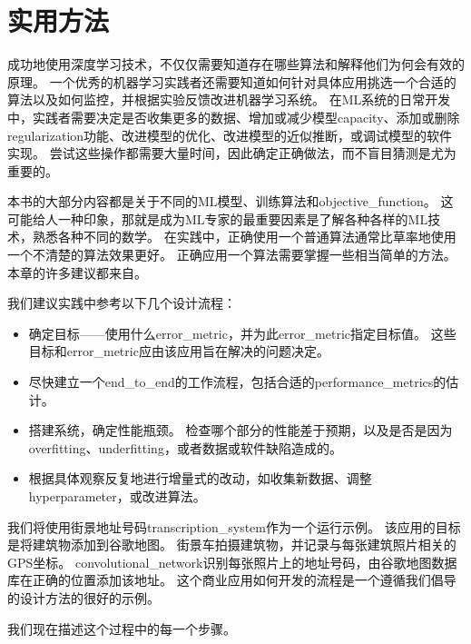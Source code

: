 \chapter{实用方法}
\label{chap:practical_methodology}
成功地使用深度学习技术，不仅仅需要知道存在哪些算法和解释他们为何会有效的原理。
一个优秀的机器学习实践者还需要知道如何针对具体应用挑选一个合适的算法以及如何监控，并根据实验反馈改进机器学习系统。
在\gls{ML}系统的日常开发中，实践者需要决定是否收集更多的数据、增加或减少模型\gls{capacity}、添加或删除\gls{regularization}功能、改进模型的优化、改进模型的近似推断，或调试模型的软件实现。
尝试这些操作都需要大量时间，因此确定正确做法，而不盲目猜测是尤为重要的。


本书的大部分内容都是关于不同的\gls{ML}模型、训练算法和\gls{objective_function}。
这可能给人一种印象，那就是成为\gls{ML}专家的最重要因素是了解各种各样的\gls{ML}技术，熟悉各种不同的数学。
在实践中，正确使用一个普通算法通常比草率地使用一个不清楚的算法效果更好。
正确应用一个算法需要掌握一些相当简单的方法。
本章的许多建议都来自\cite{ng-lecture-advice}。


我们建议实践中参考以下几个设计流程：
\begin{itemize}
\item 确定目标——使用什么\gls{error_metric}，并为此\gls{error_metric}指定目标值。
这些目标和\gls{error_metric}应由该应用旨在解决的问题决定。


\item 尽快建立一个\gls{end_to_end}的工作流程，包括合适的\gls{performance_metrics}的估计。

\item 搭建系统，确定性能瓶颈。
检查哪个部分的性能差于预期，以及是否是因为\gls{overfitting}、\gls{underfitting}，或者数据或软件缺陷造成的。

\item 根据具体观察反复地进行增量式的改动，如收集新数据、调整\gls{hyperparameter}，或改进算法。
\end{itemize}


我们将使用街景地址号码\gls{transcription_system}\citep{Goodfellow+et+al-ICLR2014a}作为一个运行示例。
该应用的目标是将建筑物添加到谷歌地图。
街景车拍摄建筑物，并记录与每张建筑照片相关的GPS坐标。
\gls{convolutional_network}识别每张照片上的地址号码，由谷歌地图数据库在正确的位置添加该地址。
这个商业应用如何开发的流程是一个遵循我们倡导的设计方法的很好的示例。

我们现在描述这个过程中的每一个步骤。



